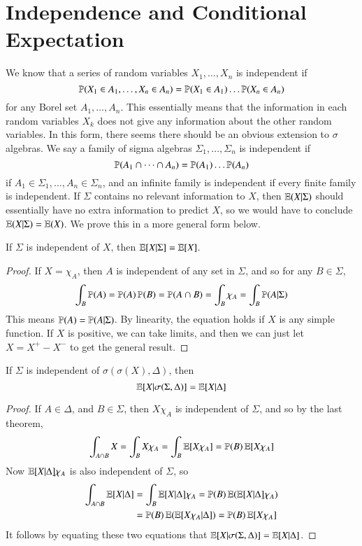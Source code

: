 \section{Independence and Conditional Expectation}

We know that a series of random variables $X_1, \dots, X_n$ is independent if
%
\[ \operatorname{\mathbb{P}}(X_1 \in A_1, \dots, X_n \in A_n) = \operatorname{\mathbb{P}}(X_1 \in A_1) \dots \operatorname{\mathbb{P}}(X_n \in A_n) \]
%
for any Borel set $A_1, \dots, A_n$. This essentially means that the information in each random variables $X_k$ does not give any information about the other random variables. In this form, there seems there should be an obvious extension to $\sigma$ algebras. We say a family of sigma algebras $\Sigma_1, \dots, \Sigma_n$ is independent if
%
\[ \operatorname{\mathbb{P}}(A_1 \cap \dots \cap A_n) = \operatorname{\mathbb{P}}(A_1) \dots \operatorname{\mathbb{P}}(A_n) \]
%
if $A_1 \in \Sigma_1, \dots, A_n \in \Sigma_n$, and an infinite family is independent if every finite family is independent. If $\Sigma$ contains no relevant information to $X$, then $\operatorname{\mathbb{E}}(X|\Sigma)$ should essentially have no extra information to predict $X$, so we would have to conclude $\operatorname{\mathbb{E}}(X|\Sigma) = \operatorname{\mathbb{E}}(X)$. We prove this in a more general form below.

\begin{theorem}
    If $\Sigma$ is independent of $X$, then $\operatorname{\mathbb{E}}[X|\Sigma] = \operatorname{\mathbb{E}}[X]$.
\end{theorem}
\begin{proof}
    If $X = \chi_A$, then $A$ is independent of any set in $\Sigma$, and so for any $B \in \Sigma$,
    \[ \int_B \operatorname{\mathbb{P}}(A) = \operatorname{\mathbb{P}}(A) \operatorname{\mathbb{P}}(B) = \operatorname{\mathbb{P}}(A \cap B) = \int_B \chi_A = \int_B \operatorname{\mathbb{P}}(A|\Sigma) \]
    This means $\operatorname{\mathbb{P}}(A) = \operatorname{\mathbb{P}}(A|\Sigma)$. By linearity, the equation holds if $X$ is any simple function. If $X$ is positive, we can take limits, and then we can just let $X = X^+ - X^-$ to get the general result.
\end{proof}

\begin{corollary}
    If $\Sigma$ is independent of $\sigma(\sigma(X), \Delta)$, then
    \[ \operatorname{\mathbb{E}}[X|\sigma(\Sigma,\Delta)] = \operatorname{\mathbb{E}}[X|\Delta] \]
\end{corollary}
\begin{proof}
    If $A \in \Delta$, and $B \in \Sigma$, then $X\chi_A$ is independent of $\Sigma$, and so by the last theorem,
    \[ \int_{A \cap B} X = \int_B X\chi_A = \int_B \operatorname{\mathbb{E}}[X\chi_A] = \operatorname{\mathbb{P}}(B) \operatorname{\mathbb{E}}[X\chi_A] \]
    Now $\operatorname{\mathbb{E}}[X|\Delta] \chi_A$ is also independent of $\Sigma$, so
    \begin{align*}
        \int_{A \cap B} \operatorname{\mathbb{E}}[X|\Delta] &= \int_B \operatorname{\mathbb{E}}[X|\Delta] \chi_A = \operatorname{\mathbb{P}}(B) \operatorname{\mathbb{E}}(\operatorname{\mathbb{E}}[X|\Delta] \chi_A)\\
        &= \operatorname{\mathbb{P}}(B) \operatorname{\mathbb{E}}(\operatorname{\mathbb{E}}[X\chi_A|\Delta]) = \operatorname{\mathbb{P}}(B) \operatorname{\mathbb{E}}[X\chi_A]
    \end{align*}
    It follows by equating these two equations that $\operatorname{\mathbb{E}}[X|\sigma(\Sigma,\Delta)] = \operatorname{\mathbb{E}}[X|\Delta]$.
\end{proof}


